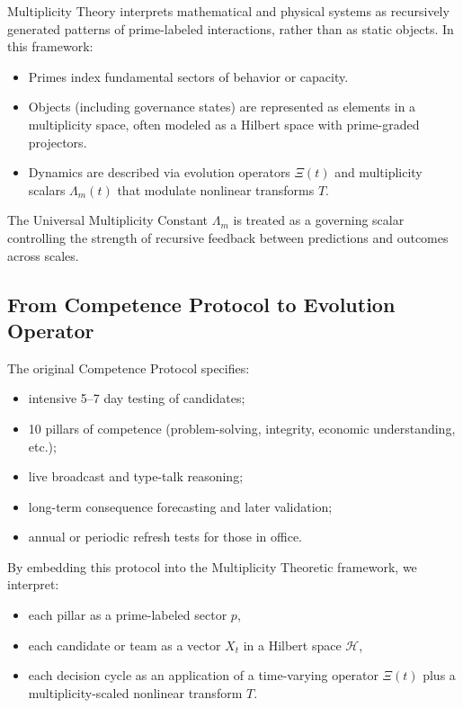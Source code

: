 \documentclass[11pt]{article}
\begin{document}
Multiplicity Theory interprets mathematical and physical systems as recursively generated patterns of prime-labeled interactions, rather than as static objects. In this framework:

\begin{itemize}[leftmargin=1.5em]
    \item Primes index fundamental sectors of behavior or capacity.
    \item Objects (including governance states) are represented as elements in a multiplicity space, often modeled as a Hilbert space with prime-graded projectors.
    \item Dynamics are described via evolution operators \(\Xi(t)\) and multiplicity scalars \(\Lambda_m(t)\) that modulate nonlinear transforms \(T\).
\end{itemize}

The Universal Multiplicity Constant \(\Lambda_m\) is treated as a governing scalar controlling the strength of recursive feedback between predictions and outcomes across scales.

\subsection{From Competence Protocol to Evolution Operator}

The original Competence Protocol specifies:
\begin{itemize}[leftmargin=1.5em]
    \item intensive 5--7 day testing of candidates;
    \item 10 pillars of competence (problem-solving, integrity, economic understanding, etc.);
    \item live broadcast and type-talk reasoning;
    \item long-term consequence forecasting and later validation;
    \item annual or periodic refresh tests for those in office.
\end{itemize}

By embedding this protocol into the Multiplicity Theoretic framework, we interpret:
\begin{itemize}[leftmargin=1.5em]
    \item each pillar as a prime-labeled sector \(p\),
    \item each candidate or team as a vector \(X_t\) in a Hilbert space \(\mathcal{H}\),
    \item each decision cycle as an application of a time-varying operator \(\Xi(t)\) plus a multiplicity-scaled nonlinear transform \(T\).
\end{itemize}
\end{document}
